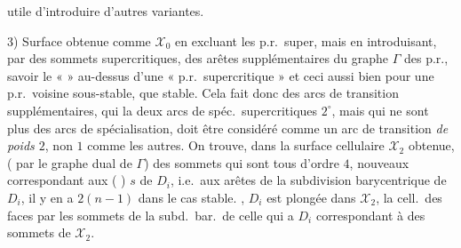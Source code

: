 \documentclass[11pt,a4paper]{article}
\begin{document}
utile d'introduire d'autres variantes.

3) \struck{\ill{}} Surface obtenue comme $\mathcal{X}_0$ en excluant les p.r.\ super, mais en introduisant, par \ill{} des sommets supercritiques, des arêtes supplémentaires du graphe $\Gamma$ des p.r., savoir le «  » au-dessus d'une « p.r.\ supercritique »  et ceci aussi bien pour une p.r.\ voisine sous-stable, que stable. Cela fait donc des arcs de transition supplémentaires, qui \emph{} la \ill{} \ill{} deux arcs de spéc.\ supercritiques \ill{} $2^{\circ}$, mais qui ne sont plus des arcs de spécialisation, \ill{} \ill{} \ill{} \ill{} \ill{} \ill{} doit être considéré comme un arc de transition \emph{de poids $2$},  non $1$ comme les autres. On trouve, dans la surface cellulaire \ill{} $\mathcal{X}_2$ obtenue,  ( par le graphe dual de $\Gamma$) des sommets qui sont tous d'ordre $4$, \ill{} nouveaux \ill{} correspondant aux \struck{\ill{} \ill{}} \add{\ill{}} (\ill{} \ill{}) \ill{} $s$ \struck{\ill{}} de $D_i$, \struck{\ill{} \ill{} \ill{}} i.e.\ aux arêtes de la subdivision barycentrique  de $D_i$, il y en a $2(n-1)$ dans le cas stable. , $D_i$ est plongée dans $\mathcal{X}_2$, \ill{} \ill{} \ill{} la \struck{\ill{}}  cell.\ des faces par les sommets de la subd.\ bar.\ de celle qui a $D_i$ \ill{} correspondant à des sommets de $\mathcal{X}_2$.
\end{document}
